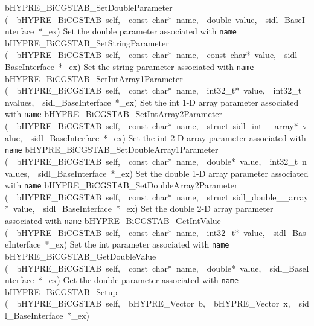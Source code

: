 \documentclass{article}
\begin{document}
\begin{cxxentry}
\begin{cxxentry}
\begin{cxxnames}
        {bHYPRE\_BiCGSTAB\_SetDoubleParameter}
        {(\ \ bHYPRE\_BiCGSTAB\ self,\ \ const\ char*\ name,\ \ double\ value,\ \ sidl\_BaseInterface\ *\_ex)}
        {
Set the double parameter associated with {\tt name}}
        {}
\label{cxx.10.3.21}
        {bHYPRE\_BiCGSTAB\_SetStringParameter}
        {(\ \ bHYPRE\_BiCGSTAB\ self,\ \ const\ char*\ name,\ \ const\ char*\ value,\ \ sidl\_BaseInterface\ *\_ex)}
        {
Set the string parameter associated with {\tt name}}
        {}
\label{cxx.10.3.22}
        {bHYPRE\_BiCGSTAB\_SetIntArray1Parameter}
        {(\ \ bHYPRE\_BiCGSTAB\ self,\ \ const\ char*\ name,\ \ int32\_t*\ value,\ \ int32\_t\ nvalues,\ \ sidl\_BaseInterface\ *\_ex)}
        {
Set the int 1-D array parameter associated with {\tt name}}
        {}
\label{cxx.10.3.23}
        {bHYPRE\_BiCGSTAB\_SetIntArray2Parameter}
        {(\ \ bHYPRE\_BiCGSTAB\ self,\ \ const\ char*\ name,\ \ struct\ sidl\_int\_\_array*\ value,\ \ sidl\_BaseInterface\ *\_ex)}
        {
Set the int 2-D array parameter associated with {\tt name}}
        {}
\label{cxx.10.3.24}
        {bHYPRE\_BiCGSTAB\_SetDoubleArray1Parameter}
        {(\ \ bHYPRE\_BiCGSTAB\ self,\ \ const\ char*\ name,\ \ double*\ value,\ \ int32\_t\ nvalues,\ \ sidl\_BaseInterface\ *\_ex)}
        {
Set the double 1-D array parameter associated with {\tt name}}
        {}
\label{cxx.10.3.25}
        {bHYPRE\_BiCGSTAB\_SetDoubleArray2Parameter}
        {(\ \ bHYPRE\_BiCGSTAB\ self,\ \ const\ char*\ name,\ \ struct\ sidl\_double\_\_array*\ value,\ \ sidl\_BaseInterface\ *\_ex)}
        {
Set the double 2-D array parameter associated with {\tt name}}
        {}
\label{cxx.10.3.26}
        {bHYPRE\_BiCGSTAB\_GetIntValue}
        {(\ \ bHYPRE\_BiCGSTAB\ self,\ \ const\ char*\ name,\ \ int32\_t*\ value,\ \ sidl\_BaseInterface\ *\_ex)}
        {
Set the int parameter associated with {\tt name}}
        {}
\label{cxx.10.3.27}
        {bHYPRE\_BiCGSTAB\_GetDoubleValue}
        {(\ \ bHYPRE\_BiCGSTAB\ self,\ \ const\ char*\ name,\ \ double*\ value,\ \ sidl\_BaseInterface\ *\_ex)}
        {
Get the double parameter associated with {\tt name}}
        {}
\label{cxx.10.3.28}
        {bHYPRE\_BiCGSTAB\_Setup}
        {(\ \ bHYPRE\_BiCGSTAB\ self,\ \ bHYPRE\_Vector\ b,\ \ bHYPRE\_Vector\ x,\ \ sidl\_BaseInterface\ *\_ex)}

\end{cxxnames}
\end{cxxentry}
\end{cxxentry}
\end{document}
